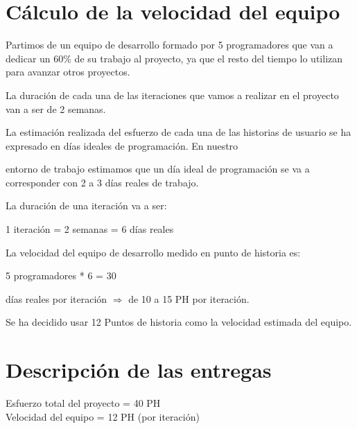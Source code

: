 \documentclass[11pt]{article}
\begin{document}
\section{Cálculo de la velocidad del equipo}
Partimos de	un equipo de desarrollo	
  formado	
  por	
  5	
  programadores	
  que	
  van	
  a	
  dedicar	
  un	
  60\%	
  de	
  su	
  trabajo	
  al	
  proyecto, ya que el resto del tiempo lo utilizan para avanzar otros proyectos.	
  

La	
  duración	
  de	
  cada	
  una	
  de	
  las	
  iteraciones	
  que	
  vamos	
  a	
  realizar	
  en	
  el	
  proyecto	
  van	
  a	
  ser	
  de	
  2	
  semanas.	
  
La	
  estimación	
  realizada	
  del	
  esfuerzo	
  de	
  cada	
  una	
  de	
  las	
  historias	
  de	
  usuario	
  se	
  ha	
  expresado	
  en	
  días	
  ideales	
  de	
  programación.	
  En	
  nuestro	
  
entorno	
  de	
  trabajo	
  estimamos	
  que	
  un	
  día	
  ideal	
  de	
  programación	
  se	
  va	
  a	
  corresponder	
  con	
  2	
  a	
  3	
  días	
  reales	
  de	
  trabajo.	
  

La	
   duración	
  de	
  una	
  iteración	
  va	
  a	
  ser:	
  

1	
iteración	
  =	
  2	
  semanas	
  =	
  6 días	
  reales	
  

La	
   velocidad	
  del	
  equipo	
  de	
  desarrollo	
  medido	
  en	
  punto	
  de	
  historia	
  es:	
  	
  

5	
  programadores	
  *	
  6	
  = 30	
  	
  días	
  reales	
  por	
  iteración $\Longrightarrow$	
  de	
  10	
  a	
  15	
  PH	
  por	
  iteración.	
  	
  	
  	
  	
  
Se	
  ha	
  decidido	
  usar	
   12	
  Puntos	
  de	
  historia	
  como	
  la	
  velocidad	
  estimada	
  del	
  equipo.	
  

\section{Descripción de las entregas}
Esfuerzo total del proyecto = 40 PH \\
Velocidad del equipo = 12 PH (por iteración) 
\end{document}
